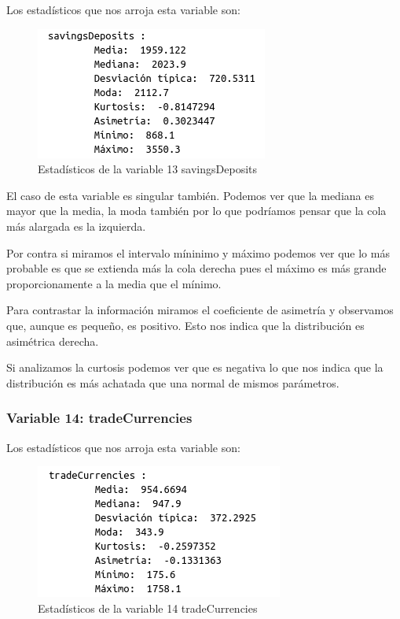 \documentclass[12pt,a4paper]{article}
\begin{document}
Los estadísticos que nos arroja esta variable son:

\begin{figure}[H]
	\centering
	\includegraphics[scale=0.7]{./Imagenes/estadisticos_savingsDeposits.png}
	\caption{Estadísticos de la variable 13 savingsDeposits}
\end{figure}

El caso de esta variable es singular también. Podemos ver que la mediana es mayor que la media, la moda también por lo que podríamos pensar que la cola más alargada es la izquierda. 

Por contra si miramos el intervalo míninimo y máximo podemos ver que lo más probable es que se extienda más la cola derecha pues el máximo es más grande proporcionamente a la media que el mínimo. 

Para contrastar la información miramos el coeficiente de asimetría y observamos que, aunque es pequeño, es positivo. Esto nos indica que la distribución es asimétrica derecha.

Si analizamos la curtosis podemos ver que es negativa lo que nos indica que la distribución es más achatada que una normal de mismos parámetros.

\subsubsection*{Variable 14: tradeCurrencies}

Los estadísticos que nos arroja esta variable son:

\begin{figure}[H]
	\centering
	\includegraphics[scale=0.7]{./Imagenes/estadisticos_tradeCurrencies.png}
	\caption{Estadísticos de la variable 14 tradeCurrencies}
\end{figure}
\end{document}
